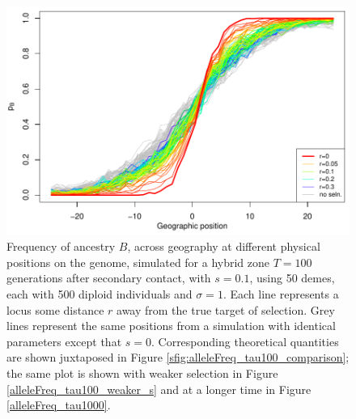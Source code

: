 \begin{figure}
    \includegraphics{figs/alleleFrequencies_sim.pdf}
    \caption{
    Frequency of ancestry $B$,
    across geography at different physical positions on the genome, simulated for a hybrid zone
     $T=100$ generations after secondary contact, with $s=0.1$,
     using 50 demes, each with 500 diploid individuals and $\sigma=1$.
    Each line represents a locus some distance $r$ away from the true target of selection.
    Grey lines represent the same positions from a simulation with
    identical parameters except that $s=0$.
    Corresponding theoretical quantities are shown juxtaposed in Figure \ref{sfig:alleleFreq_tau100_comparison};
    the same plot is shown with weaker selection in Figure \ref{alleleFreq_tau100_weaker_s} and at a longer time in Figure \ref{alleleFreq_tau1000}.
}\label{alleleFreq_tau100}
\end{figure}



